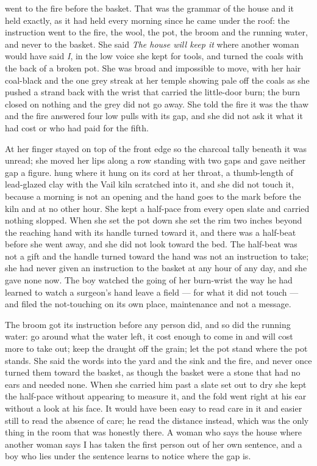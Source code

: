 \scenebreak

 went to the fire before the basket. That was the grammar of the house and it held exactly, as it had held every morning since he came under the roof: the instruction went to the fire, the wool, the pot, the broom and the running water, and never to the basket. She said \emph{The house will keep it} where another woman would have said \emph{I}, in the low voice she kept for tools, and turned the coals with the back of a broken pot. She was broad and impossible to move, with her hair coal-black and the one grey streak at her temple showing pale off the coals as she pushed a strand back with the wrist that carried the little-door burn; the burn closed on nothing and the grey did not go away. She told the fire it was the thaw and the fire answered four low pulls with its gap, and she did not ask it what it had cost or who had paid for the fifth.

At  her finger stayed on top of the front edge so the charcoal tally beneath it was unread; she moved her lips along a row standing with two gaps and gave neither gap a figure.  hung where it hung on its cord at her throat, a thumb-length of lead-glazed clay with the Vail kiln scratched into it, and she did not touch it, because a morning is not an opening and the hand goes to the mark before the kiln and at no other hour. She kept a half-pace from every open slate and carried nothing slopped. When she set the pot down she set the rim two inches beyond the reaching hand with its handle turned toward it, and there was a half-beat before she went away, and she did not look toward the bed. The half-beat was not a gift and the handle turned toward the hand was not an instruction to take; she had never given an instruction to the basket at any hour of any day, and she gave none now. The boy watched the going of her burn-wrist the way he had learned to watch a surgeon's hand leave a field --- for what it did not touch --- and filed the not-touching on its own place, maintenance and not a message.

The broom got its instruction before any person did, and so did the running water: go around what the water left, it cost enough to come in and will cost more to take out; keep the draught off the grain; let the pot stand where the pot stands. She said the words into the yard and the sink and the fire, and never once turned them toward the basket, as though the basket were a stone that had no ears and needed none. When she carried him past a slate set out to dry she kept the half-pace without appearing to measure it, and the fold went right at his ear without a look at his face. It would have been easy to read care in it and easier still to read the absence of care; he read the distance instead, which was the only thing in the room that was honestly there. A woman who says the house where another woman says I has taken the first person out of her own sentence, and a boy who lies under the sentence learns to notice where the gap is.

